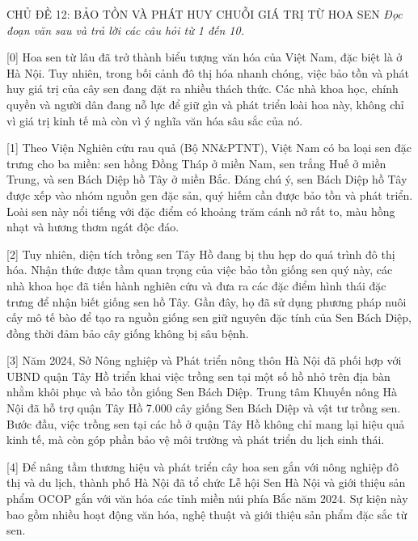 \documentclass[12pt,a4paper,twoside]{article}
\newenvironment{readingpassage}[1][]{%
    \begin{tcolorbox}[enhanced, colback=grayLight, colframe=secondaryBlue,
        coltitle=textDark, fonttitle=\bfseries, title={#1},
        rounded corners, arc=3mm, boxrule=1pt,
        left=15pt, right=15pt, top=10pt, bottom=10pt,
        breakable, before skip=10pt, after skip=10pt, drop fuzzy shadow]
    \setstretch{1.3}
}{\end{tcolorbox}}
\begin{document}
\newpage
\label{a_cd12}
\begin{topicbox}{\large CHỦ ĐỀ 12: BẢO TỒN VÀ PHÁT HUY CHUỖI GIÁ TRỊ TỪ HOA SEN}
\vspace{8pt}
\textit{Đọc đoạn văn sau và trả lời các câu hỏi từ 1 đến 10.}
\vspace{6pt}
\end{topicbox}
\vspace{5pt}
\begin{readingpassage}[]
[0] Hoa sen từ lâu đã trở thành biểu tượng văn hóa của Việt Nam, đặc biệt là ở Hà Nội. Tuy nhiên, trong bối cảnh đô thị hóa nhanh chóng, việc bảo tồn và phát huy giá trị của cây sen đang đặt ra nhiều thách thức. Các nhà khoa học, chính quyền và người dân đang nỗ lực để giữ gìn và phát triển loài hoa này, không chỉ vì giá trị kinh tế mà còn vì ý nghĩa văn hóa sâu sắc của nó.

[1] Theo Viện Nghiên cứu rau quả (Bộ NN\&PTNT), Việt Nam có ba loại sen đặc trưng cho ba miền: sen hồng Đồng Tháp ở miền Nam, sen trắng Huế ở miền Trung, và sen Bách Diệp hồ Tây ở miền Bắc. Đáng chú ý, sen Bách Diệp hồ Tây được xếp vào nhóm nguồn gen đặc sản, quý hiếm cần được bảo tồn và phát triển. Loài sen này nổi tiếng với đặc điểm có khoảng trăm cánh nở rất to, màu hồng nhạt và hương thơm ngát độc đáo.

[2] Tuy nhiên, diện tích trồng sen Tây Hồ đang bị thu hẹp do quá trình đô thị hóa. Nhận thức được tầm quan trọng của việc bảo tồn giống sen quý này, các nhà khoa học đã tiến hành nghiên cứu và đưa ra các đặc điểm hình thái đặc trưng để nhận biết giống sen hồ Tây. Gần đây, họ đã sử dụng phương pháp nuôi cấy mô tế bào để tạo ra nguồn giống sen giữ nguyên đặc tính của Sen Bách Diệp, đồng thời đảm bảo cây giống không bị sâu bệnh.

[3] Năm 2024, Sở Nông nghiệp và Phát triển nông thôn Hà Nội đã phối hợp với UBND quận Tây Hồ triển khai việc trồng sen tại một số hồ nhỏ trên địa bàn nhằm khôi phục và bảo tồn giống Sen Bách Diệp. Trung tâm Khuyến nông Hà Nội đã hỗ trợ quận Tây Hồ 7.000 cây giống Sen Bách Diệp và vật tư trồng sen. Bước đầu, việc trồng sen tại các hồ ở quận Tây Hồ không chỉ mang lại hiệu quả kinh tế, mà còn góp phần bảo vệ môi trường và phát triển du lịch sinh thái.

[4] Để nâng tầm thương hiệu và phát triển cây hoa sen gắn với nông nghiệp đô thị và du lịch, thành phố Hà Nội đã tổ chức Lễ hội Sen Hà Nội và giới thiệu sản phẩm OCOP gắn với văn hóa các tỉnh miền núi phía Bắc năm 2024. Sự kiện này bao gồm nhiều hoạt động văn hóa, nghệ thuật và giới thiệu sản phẩm đặc sắc từ sen.


\end{readingpassage}
\end{document}
